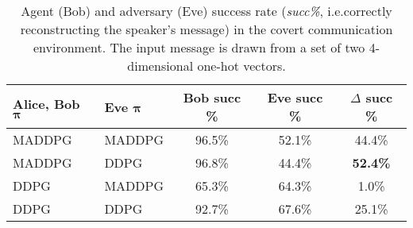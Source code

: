 \documentclass{article}
\newcommand{\pol}[0]{\pmb{\pi}}
\begin{document}
\begin{table*}[ht!]
\small
\centering
\begin{tabular}{l l c c c}
\toprule
Alice, Bob $\pol$& Eve $\pol$& \textbf{Bob succ \% }&    \textbf{Eve succ \%} & \textbf{$\Delta$ succ \%}  \\ \hline
MADDPG & MADDPG & 96.5\% & 52.1\% & 44.4\% \\
MADDPG & DDPG & 96.8\% & 44.4\% & \textbf{52.4\%} \\
DDPG & MADDPG & 65.3\% & 64.3\% & 1.0\% \\
DDPG & DDPG &  92.7\% & 67.6\% & 25.1\%\\
\bottomrule
\end{tabular}
\caption{\label{tab:simple_crypto} Agent (Bob) and adversary (Eve) success rate (\textit{succ\@ \%}, i.e.\@ correctly reconstructing the speaker's message) in the covert communication environment. The input message is drawn from a set of two 4-dimensional one-hot vectors.}
\end{table*}
\end{document}
